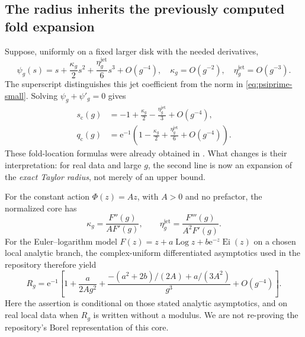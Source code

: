 \documentclass[11pt,a4paper]{article}
\numberwithin{equation}{section}
\theoremstyle{definition}
\theoremstyle{remark}
\newcommand{\e}{\mathrm e}
\newcommand{\Log}{\operatorname{Log}}
\begin{document}
\subsection{The radius inherits the previously computed fold expansion}
Suppose, uniformly on a fixed larger disk with the needed derivatives,
\begin{equation}
 \psi_g(s)=s+\frac{\kappa_g}{2}s^2
                  +\frac{\eta_g^{\mathrm{jet}}}{6}s^3+O(g^{-4}),
 \quad \kappa_g=O(g^{-2}),\quad \eta_g^{\mathrm{jet}}=O(g^{-3}).
 \label{eq:repo-jet}
\end{equation}
The superscript distinguishes this jet coefficient from the norm in \eqref{eq:psiprime-small}. Solving $\psi_g+\psi'_g=0$ gives
\begin{align}
 s_{\mathrm c}(g)&=-1+\frac{\kappa_g}{2}
                    -\frac{\eta_g^{\mathrm{jet}}}{3}+O(g^{-4}),\\
 q_{\mathrm c}(g)&=\e^{-1}\left(1-\frac{\kappa_g}{2}
                   +\frac{\eta_g^{\mathrm{jet}}}{6}+O(g^{-4})\right).
 \label{eq:fold-inherited}
\end{align}
These fold-location formulas were already obtained in \cite{repo-stokes}. What changes is their interpretation: for real data and large $g$, the second line is now an expansion of the \emph{exact Taylor radius}, not merely of an upper bound.

For the constant action $\Phi(z)=Az$, with $A>0$ and no prefactor, the normalized core has
\[
 \kappa_g=\frac{F''(g)}{AF'(g)},\qquad
 \eta_g^{\mathrm{jet}}=\frac{F'''(g)}{A^2F'(g)}.
\]
For the Euler--logarithm model $F(z)=z+a\Log z+b\e^{-z}\operatorname{Ei}(z)$ on a chosen local analytic branch, the complex-uniform differentiated asymptotics used in the repository therefore yield
\begin{equation}
 R_g=\e^{-1}\left[
 1+\frac{a}{2Ag^2}
 +\frac{-(a^2+2b)/(2A)+a/(3A^2)}{g^3}
 +O(g^{-4})\right].
 \label{eq:euler-radius}
\end{equation}
Here the assertion is conditional on those stated analytic asymptotics, and on real local data when $R_g$ is written without a modulus. We are not re-proving the repository's Borel representation of this core.
\end{document}
